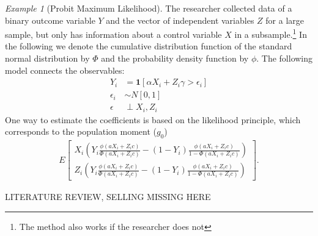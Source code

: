 \documentclass{article}
\theoremstyle{definition}
\theoremstyle{remark}
\newtheorem{example}{Example}
\begin{document}
\begin{example}[Probit Maximum Likelihood]
	The researcher collected data of a binary outcome variable $Y$ and the vector of independent variables $Z$ for a large sample, but only has information about a control variable $X$ in a subsample.\footnote{The method also works if the researcher does not } In the following we denote the cumulative distribution function of the standard normal distribution by $\Phi$ and the probability density function by $\phi$. The following model connects the observables:
	\begin{align}
	Y_i&= \mathbf{1}[\alpha X_i + Z_i\gamma>\epsilon_i] \label{eq_probitStruc}\\
	\epsilon_i&\sim N[0,1] \label{eq_probitFunc} \\
	\epsilon &\perp X_i,Z_i \label{eq_probitExog}
	\end{align}
	One way to estimate the coefficients is based on the likelihood principle, which corresponds to the population moment ($g_0$)
	\begin{align*}
	E\left[\begin{array}{c}
	X_i\left(Y_i \frac{\phi(aX_i+Z_ic)}{\Phi(aX_i+Z_ic)} - (1-Y_i)\frac{\phi(aX_i+Z_ic)}{1-\Phi(aX_i+Z_ic)}\right) \\
	Z_i\left(Y_i \frac{\phi(aX_i+Z_ic)}{\Phi(aX_i+Z_ic)} - (1-Y_i)\frac{\phi(aX_i+Z_ic)}{1-\Phi(aX_i+Z_ic)}\right)
	\end{array}
	\right].
	\end{align*}
\end{example}

{\color{red} LITERATURE REVIEW, SELLING MISSING HERE}
\end{document}
